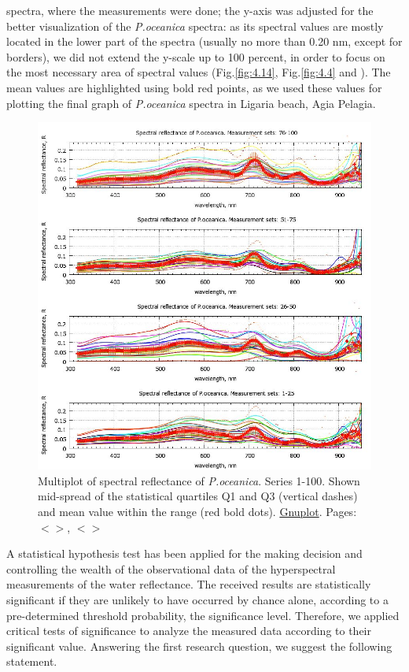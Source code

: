 \documentclass[11pt]{article}
\begin{document}
spectra, where the measurements were done; the y-axis was adjusted for the better visualization of the
\textit{P.oceanica} spectra: as its spectral values are mostly located in the lower part of the spectra (usually no
more than 0.20 nm, except for borders), we did not extend the y-scale up to 100 percent, in order to
focus on the most necessary area of spectral values (Fig.\ref{fig:4.14}, Fig.\ref{fig:4.4} and ). The mean values are
highlighted using bold red points, as we used these values for plotting the final graph of \textit{P.oceanica} spectra in
Ligaria beach, Agia Pelagia.

\begin{figure}[H]
	\begin{center}
		\includegraphics[scale=0.50]{GNU-13.jpg}
		\caption{Multiplot of spectral reflectance of \textit{P.oceanica}. Series 1-100. Shown mid-spread of the statistical quartiles Q1 and Q3 (vertical dashes) and mean value within the range (red bold dots). \href{http://www.gnuplot.info/}{Gnuplot}­. Pages: $<$\pageref{page-21}$>$, $<$\pageref{page-41}$>$}
		\label{fig:4.13}
	\end{center}
\end{figure}

A statistical hypothesis test has been applied for the making decision and controlling the wealth of the observational data of the hyperspectral measurements of the water reflectance.
The received results are statistically significant if they are unlikely to have occurred by chance alone,
according to a pre-determined threshold probability, the significance level. Therefore, we applied
critical tests of significance to analyze the measured data according to their significant value.
Answering the first research question, we suggest the following statement.
\end{document}

